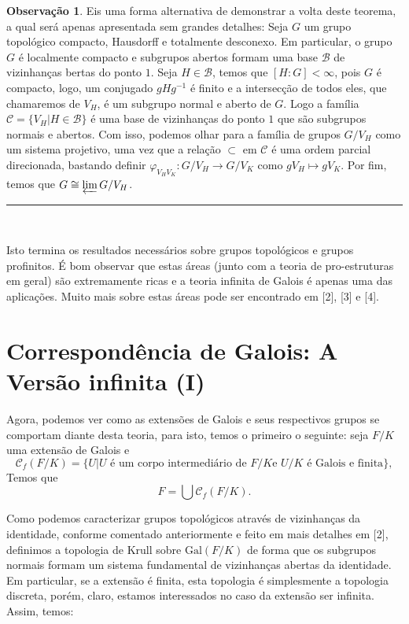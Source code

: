 \documentclass[12pt,a4paper]{article}
\def\eop{\hfill\rule{2.5mm}{2.5mm} \\ }
\theoremstyle{definition}
\newtheorem{obs}[mydef]{Observação}
\begin{document}
\begin{obs} Eis uma forma alternativa de demonstrar a volta deste teorema, a qual será apenas apresentada sem grandes detalhes: Seja $G$ um grupo topológico compacto, Hausdorff e totalmente desconexo. Em particular, o grupo $G$ é localmente compacto e subgrupos abertos formam uma base $\mathscr{B}$ de vizinhanças bertas do ponto $1$. Seja $H\in \mathscr{B}$, temos que $[H : G]<\infty$, pois $G$ é compacto, logo, um conjugado $gHg^{-1}$ é finito e a intersecção de todos eles, que chamaremos de $V_H$, é um subgrupo normal e aberto de $G$. Logo a família $\mathscr{C}=\{V_H | H\in\mathscr{B}\}$ é uma base de vizinhanças do ponto $1$ que são subgrupos normais e abertos. Com isso, podemos olhar para a família de grupos $G/V_H$ como um sistema projetivo, uma vez que a relação $\subset$ em $\mathscr{C}$ é uma ordem parcial direcionada, bastando definir $\varphi_{V_H V_K}: G/V_H\rightarrow G/V_K$ como $gV_H\mapsto gV_K$. Por fim, temos que $G\cong \varprojlim G/V_H$.  \eop \end{obs} 

Isto termina os resultados necessários sobre grupos topológicos e grupos profinitos. É bom observar que estas áreas (junto com a teoria de pro-estruturas em geral) são extremamente ricas e a teoria infinita de Galois é apenas uma das aplicações. Muito mais sobre estas áreas pode ser encontrado em [2], [3] e [4].


\section{Correspondência de Galois: A Versão infinita (I)}

Agora, podemos ver como as extensões de Galois e seus respectivos grupos se comportam diante desta teoria, para isto, temos o primeiro o seguinte: seja $F/K$ uma extensão de Galois e $$ \mathcal{C}_f (F/K)=\{ U | U \text{ é um corpo intermediário de } F/K \text{e } U/K \text{ é Galois e finita} \},$$ Temos que $$F=\bigcup \mathcal{C}_f (F/K).$$

Como podemos caracterizar grupos topológicos através de vizinhanças da identidade, conforme comentado anteriormente e feito em mais detalhes em [2], definimos a topologia de Krull sobre $\text{Gal}(F/K)$ de forma que os subgrupos normais formam um sistema fundamental de vizinhanças abertas da identidade. Em particular, se a extensão é finita, esta topologia é simplesmente a topologia discreta, porém, claro, estamos interessados no caso da extensão ser infinita. Assim, temos:
\end{document}
